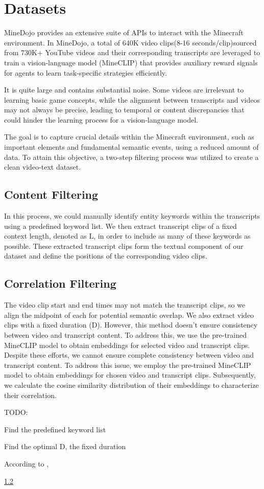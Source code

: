 \documentclass{article}
\begin{document}
\section{Datasets}

MineDojo provides an extensive suite of APIs to interact with the Minecraft environment.  In MineDojo, a total of 640K video clips(8-16 seconds/clip)sourced from 730K+ YouTube videos and their corresponding transcripts are leveraged to train a vision-language model (MineCLIP) that provides auxiliary reward signals for agents to learn task-specific strategies efficiently.

It is quite large and contains substantial noise. Some videos are irrelevant to learning basic game concepts, while the alignment between transcripts and videos may not always be precise, leading to temporal or content discrepancies that could hinder the learning process for a vision-language model.

The goal is to capture crucial details within the Minecraft environment, such as important elements and fundamental semantic events, using a reduced amount of data. To attain this objective, a two-step filtering process was utilized to create a clean video-text dataset.

\subsection{Content Filtering}
In this process, we could manually identify entity keywords within the transcripts using a predefined keyword list. We then extract transcript clips of a fixed context length, denoted as L, in order to include as many of these keywords as possible. These extracted transcript clips form the textual component of our dataset and define the positions of the corresponding video clips.

\subsection{Correlation Filtering}
The video clip start and end times may not match the transcript clips, so we align the midpoint of each for potential semantic overlap. We also extract video clips with a fixed duration (D). However, this method doesn't ensure consistency between video and transcript content. To address this, we use the pre-trained MineCLIP model to obtain embeddings for selected video and transcript clips.
Despite these efforts, we cannot ensure complete consistency between video and transcript content. To address this issue, we employ the pre-trained MineCLIP model to obtain embeddings for chosen video and transcript clips. Subsequently, we calculate the cosine similarity distribution of their embeddings to characterize their correlation.

TODO:

Find the predefined keyword list

Find the optimal D, the fixed duration

According to \cite{ding2023clip4mc},


\ref{}
\medskip

\printglossary


\printbibliography
\end{document}

